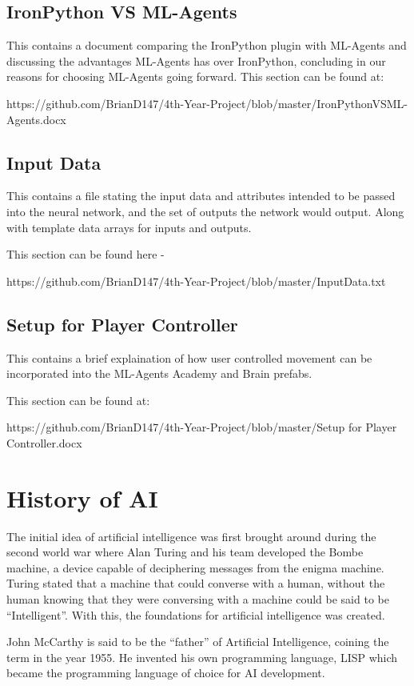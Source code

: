 \subsection{IronPython VS ML-Agents}
This contains a document comparing the IronPython plugin with ML-Agents and discussing the advantages ML-Agents has over IronPython, concluding in our reasons for choosing ML-Agents going forward.
This section can be found at: 

    https://github.com/BrianD147/4th-Year-Project/blob/master/IronPythonVSML-Agents.docx

\subsection{Input Data}
This contains a file stating the input data and attributes intended to be passed into the neural network, and the set of outputs the network would output. Along with template data arrays for inputs and outputs.

This section can be found here - 

    https://github.com/BrianD147/4th-Year-Project/blob/master/InputData.txt


\subsection{Setup for Player Controller}
This contains a brief explaination of how user controlled movement can be incorporated into the ML-Agents Academy and Brain prefabs.

This section can be found at:           

    https://github.com/BrianD147/4th-Year-Project/blob/master/Setup for Player Controller.docx

	
	
\section{History of AI}
The initial idea of artificial intelligence was first brought around during the second world war where Alan Turing and his team developed the Bombe machine, a device capable of deciphering messages from the enigma machine. Turing stated that a machine that could converse with a human, without the human knowing that they were conversing with a machine could be said to be “Intelligent”.  With this, the foundations for artificial intelligence was created. 

John McCarthy is said to be the “father” of Artificial Intelligence, coining the term in the year 1955. He invented his own programming language, LISP which became the programming language of choice for AI development. 

